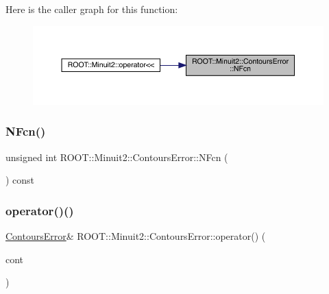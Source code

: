 Here is the caller graph for this function\+:\nopagebreak
\begin{figure}[H]
\begin{center}
\leavevmode
\includegraphics[width=350pt]{d3/de9/classROOT_1_1Minuit2_1_1ContoursError_a1342abcb15690e6897ad860e7f05026d_icgraph}
\end{center}
\end{figure}
\mbox{\label{classROOT_1_1Minuit2_1_1ContoursError_a1342abcb15690e6897ad860e7f05026d}} 
\subsubsection{\texorpdfstring{NFcn()}{NFcn()}\hspace{0.1cm}{\footnotesize\ttfamily [2/2]}}
{\footnotesize\ttfamily unsigned int R\+O\+O\+T\+::\+Minuit2\+::\+Contours\+Error\+::\+N\+Fcn (\begin{DoxyParamCaption}{ }\end{DoxyParamCaption}) const\hspace{0.3cm}{\ttfamily [inline]}}

\mbox{\label{classROOT_1_1Minuit2_1_1ContoursError_a17f1d0a4579d605cd25da8e0e27bf4ba}} 
\subsubsection{\texorpdfstring{operator()()}{operator()()}\hspace{0.1cm}{\footnotesize\ttfamily [1/4]}}
{\footnotesize\ttfamily \mbox{\hyperlink{classROOT_1_1Minuit2_1_1ContoursError}{Contours\+Error}}\& R\+O\+O\+T\+::\+Minuit2\+::\+Contours\+Error\+::operator() (\begin{DoxyParamCaption}\item[{const \mbox{\hyperlink{classROOT_1_1Minuit2_1_1ContoursError}{Contours\+Error}} \&}]{cont }\end{DoxyParamCaption})\hspace{0.3cm}{\ttfamily [inline]}}

